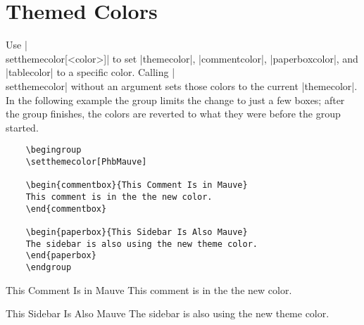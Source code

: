 \documentclass[letterpaper,twocolumn,openany]{dndbook}
\begin{document}
	\section{Themed Colors}
	Use |\\setthemecolor[<color>]| to set |themecolor|, |commentcolor|, |paperboxcolor|, and |tablecolor| to a specific color. Calling |\\setthemecolor| without an argument sets those colors to the current |themecolor|. In the following example the group limits the change to just a few boxes; after the group finishes, the colors are reverted to what they were before the group started.
	
	\begin{lstlisting}
	\begingroup
	\setthemecolor[PhbMauve]
	
	\begin{commentbox}{This Comment Is in Mauve}
	This comment is in the the new color.
	\end{commentbox}
	
	\begin{paperbox}{This Sidebar Is Also Mauve}
	The sidebar is also using the new theme color.
	\end{paperbox}
	\endgroup
	\end{lstlisting}
	
	\begingroup
	\setthemecolor[PhbMauve]
	
	\begin{commentbox}{This Comment Is in Mauve}
		This comment is in the the new color.
	\end{commentbox}
	
	\begin{paperbox}{This Sidebar Is Also Mauve}
		The sidebar is also using the new theme color.
	\end{paperbox}
	
	\endgroup
	
\end{document}
